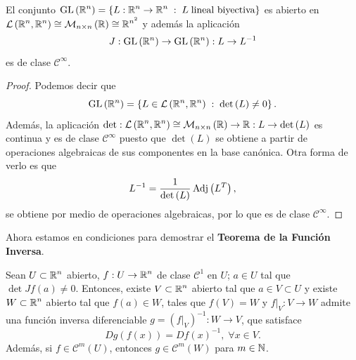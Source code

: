 \begin{lema}
	El conjunto $\displaystyle \operatorname{GL}\left(\mathbb{R}^{n}\right) = \left\{ L : \mathbb{R}^{n} \to \mathbb{R}^{n} \; : \; L\; \text{lineal biyectiva}\right\}  $ es abierto en $\displaystyle \mathcal{L}\left(\mathbb{R}^{n}, \mathbb{R}^{n}\right) \cong \mathcal{M}_{n \times n} \left(\mathbb{R}\right)\cong \mathbb{R}^{n^{2}}$ y además la aplicación
	\[J : \operatorname{GL}\left(\mathbb{R}^{n}\right) \to \operatorname{GL}\left(\mathbb{R}^{n}\right) : L \to L^{-1}	\]
	es de clase $\displaystyle \mathcal{C}^{\infty} $. 
\end{lema}
\begin{proof}
Podemos decir que 
\[\operatorname{GL}\left(\mathbb{R}^{n}\right) = \left\{ L \in \mathcal{L}\left(\mathbb{R}^{n}, \mathbb{R}^{n}\right) \; : \; \det\left(L\right) \neq 0\right\}  .\]
Además, la aplicación $\displaystyle \det : \mathcal{L}\left(\mathbb{R}^{n}, \mathbb{R}^{n}\right) \cong \mathcal{M}_{n \times n} \left(\mathbb{R}\right) \to \mathbb{R} : L \to \det\left(L\right)$  es continua y es de clase $\displaystyle \mathcal{C}^{\infty} $ puesto que $\displaystyle \det\left(L\right) $ se obtiene a partir de operaciones algebraicas de sus componentes en la base canónica. 
Otra forma de verlo es que 
\[L^{-1} = \frac{1}{\det\left(L\right)}\operatorname{Adj}\left(L^{T}\right) ,\]
se obtiene por medio de operaciones algebraicas, por lo que es de clase $\displaystyle \mathcal{C}^{\infty} $. 
\end{proof}
Ahora estamos en condiciones para demostrar el \textbf{Teorema de la Función Inversa}. 
\begin{theorem}
Sean $\displaystyle U \subset \mathbb{R}^{n} $ abierto, $\displaystyle f : U \to \mathbb{R}^{n} $ de clase $\displaystyle \mathcal{C}^{1} $ en $\displaystyle U $; $\displaystyle a\in U $ tal que $\displaystyle \det Jf\left(a\right) \neq 0 $. Entonces, existe $\displaystyle V \subset \mathbb{R}^{n} $ abierto tal que $\displaystyle a \in V \subset U $ y existe $\displaystyle W \subset \mathbb{R}^{n} $ abierto tal que $\displaystyle f\left(a\right) \in W $, tales que $\displaystyle f\left(V\right) = W $ y $\displaystyle f|_{V} : V \to W $ admite una función inversa diferenciable $\displaystyle g = \left(f|_{V}\right)^{-1} : W \to V $, que satisface 
\[Dg\left(f\left(x\right)\right) = Df\left(x\right)^{-1}, \; \forall x \in V .\]
Además, si $\displaystyle f \in \mathcal{C}^{m}\left(U\right) $, entonces $\displaystyle g \in \mathcal{C}^{m}\left(W\right) $ para $\displaystyle m \in \mathbb{N} $.
\end{theorem}
